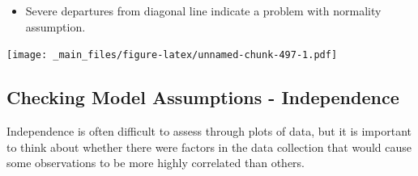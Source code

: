 \documentclass[]{book}
\newenvironment{Shaded}{\begin{snugshade}}{\end{snugshade}}
\newcommand{\KeywordTok}[1]{\textcolor[rgb]{0.13,0.29,0.53}{\textbf{#1}}}
\newcommand{\DataTypeTok}[1]{\textcolor[rgb]{0.13,0.29,0.53}{#1}}
\newcommand{\DecValTok}[1]{\textcolor[rgb]{0.00,0.00,0.81}{#1}}
\newcommand{\StringTok}[1]{\textcolor[rgb]{0.31,0.60,0.02}{#1}}
\newcommand{\OperatorTok}[1]{\textcolor[rgb]{0.81,0.36,0.00}{\textbf{#1}}}
\newcommand{\NormalTok}[1]{#1}
\providecommand{\tightlist}{%
  \setlength{\itemsep}{0pt}\setlength{\parskip}{0pt}}
\begin{document}
\begin{itemize}
\tightlist
\item
  Severe departures from diagonal line indicate a problem with normality
  assumption.
\end{itemize}

\begin{Shaded}
\end{Shaded}

\texttt{[image: \_main\_files/figure-latex/unnamed-chunk-497-1.pdf]}

\subsection{Checking Model Assumptions -
Independence}\label{checking-model-assumptions---independence}

Independence is often difficult to assess through plots of data, but it
is important to think about whether there were factors in the data
collection that would cause some observations to be more highly
correlated than others.
\end{document}
